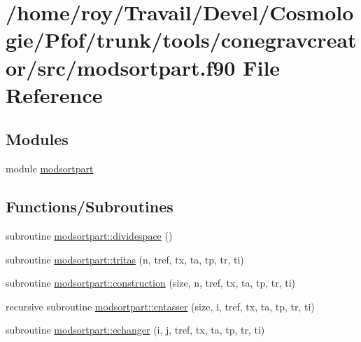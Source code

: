 \hypertarget{conegravcreator_2src_2modsortpart_8f90}{}\section{/home/roy/\+Travail/\+Devel/\+Cosmologie/\+Pfof/trunk/tools/conegravcreator/src/modsortpart.f90 File Reference}
\label{conegravcreator_2src_2modsortpart_8f90}
\subsection*{Modules}
\begin{DoxyCompactItemize}
\item 
module \hyperlink{namespacemodsortpart}{modsortpart}
\end{DoxyCompactItemize}
\subsection*{Functions/\+Subroutines}
\begin{DoxyCompactItemize}
\item 
subroutine \hyperlink{namespacemodsortpart_a45cee800346ecf7b0cdc0c235bd06c48}{modsortpart\+::dividespace} ()
\item 
subroutine \hyperlink{namespacemodsortpart_a1a6a9f53783f2139141e9064f49d2f1b}{modsortpart\+::tritas} (n, tref, tx, ta, tp, tr, ti)
\item 
subroutine \hyperlink{namespacemodsortpart_a18d32ea34d090d81f8f618e593860e72}{modsortpart\+::construction} (size, n, tref, tx, ta, tp, tr, ti)
\item 
recursive subroutine \hyperlink{namespacemodsortpart_a237cc515810e4aa5203ebead3f59a3a7}{modsortpart\+::entasser} (size, i, tref, tx, ta, tp, tr, ti)
\item 
subroutine \hyperlink{namespacemodsortpart_a0b24fe38ef401030203a179425190ba9}{modsortpart\+::echanger} (i, j, tref, tx, ta, tp, tr, ti)
\end{DoxyCompactItemize}
